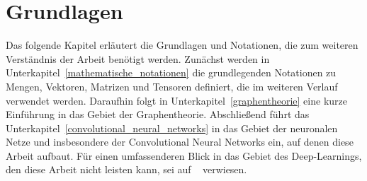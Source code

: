 \chapter{Grundlagen}
\label{grundlagen}

Das folgende Kapitel erläutert die Grundlagen und Notationen, die zum weiteren Verständnis der Arbeit benötigt werden.
Zunächst werden in Unterkapitel~\ref{mathematische_notationen} die grundlegenden Notationen zu Mengen, Vektoren, Matrizen und Tensoren definiert, die im weiteren Verlauf verwendet werden.
Daraufhin folgt in Unterkapitel~\ref{graphentheorie} eine kurze Einführung in das Gebiet der Graphentheorie.
Abschließend führt das Unterkapitel~\ref{convolutional_neural_networks} in das Gebiet der neuronalen Netze und insbesondere der Convolutional Neural Networks ein, auf denen diese Arbeit aufbaut.
Für einen umfassenderen Blick in das Gebiet des Deep-Learnings, den diese Arbeit nicht leisten kann, sei auf \citeauthor{Nielsen}~\cite{Nielsen} verwiesen.




